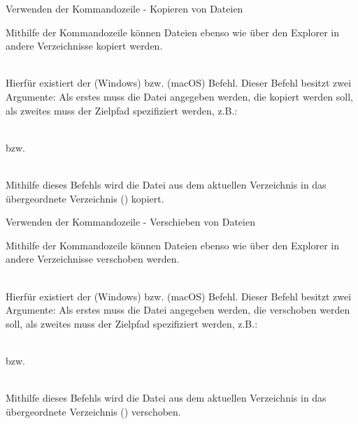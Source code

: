     
    \begin{frame}{Verwenden der Kommandozeile - Kopieren von Dateien}
        
        Mithilfe der Kommandozeile können Dateien ebenso wie über den Explorer in andere Verzeichnisse kopiert werden. \\~\
        
        Hierfür existiert der  (Windows) bzw.  (macOS) Befehl. Dieser Befehl besitzt zwei Argumente: Als erstes muss die Datei angegeben werden, die kopiert werden soll, als zweites muss der Zielpfad spezifiziert werden, z.B.: \\~\
        
         bzw. \\~\
        
        Mithilfe dieses Befehls wird die Datei  aus dem aktuellen Verzeichnis in das übergeordnete Verzeichnis () kopiert.
        
    \end{frame}
    
    \begin{frame}{Verwenden der Kommandozeile - Verschieben von Dateien}
        
        Mithilfe der Kommandozeile können Dateien ebenso wie über den Explorer in andere Verzeichnisse verschoben werden. \\~\
        
        Hierfür existiert der  (Windows) bzw.  (macOS) Befehl. Dieser Befehl besitzt zwei Argumente: Als erstes muss die Datei angegeben werden, die verschoben werden soll, als zweites muss der Zielpfad spezifiziert werden, z.B.: \\~\
        
         bzw. \\~\
        
        Mithilfe dieses Befehls wird die Datei  aus dem aktuellen Verzeichnis in das übergeordnete Verzeichnis () verschoben.
        
    \end{frame}
    
